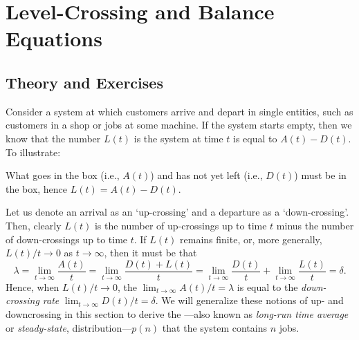 \section{Level-Crossing and Balance Equations}
\label{sec:level-cross-balance}


\subsection*{Theory and Exercises}



Consider a system at which customers arrive and depart in single
entities, such as customers in a shop or jobs at some machine.  If the
system starts empty, then we know that the number $L(t)$ is the system
at time $t$ is equal to $A(t) - D(t)$. To illustrate:

\begin{figure}[h]
  \centering
{}
\end{figure}

\noindent What goes in the box (i.e., $A(t)$) and has not yet left
  (i.e., $D(t)$) must be in the box, hence $L(t)=A(t)-D(t)$. 



Let us denote an arrival as an `up-crossing' and a departure as a
`down-crossing'.  Then, clearly $L(t)$ is the number of up-crossings
up to time $t$ minus the number of down-crossings up to time $t$. If
$L(t)$ remains finite, or, more generally, $L(t)/t \to 0$ as $t\to\infty$, then it
must be that
\begin{equation*}
  \lambda =  \lim_{t \to \infty} \frac{A(t)}t  = \lim_{t \to \infty} \frac{D(t)+L(t)}t =  \lim_{t \to \infty} \frac{D(t)}t + \lim_{t \to \infty} \frac{L(t)}t 
  = \delta.  
\end{equation*}
Hence, when $L(t)/t\to0$, the 
$\lim_{t \to \infty} A(t)/t = \lambda$ is equal to the \emph{down-crossing rate}
$\lim_{t \to \infty} D(t)/t = \delta$.  We will generalize these notions of up- and
downcrossing in this section to derive the ---also known as \emph{long-run time average} or \emph{steady-state},
distribution---$p(n)$ that the system contains $n$ jobs. 

